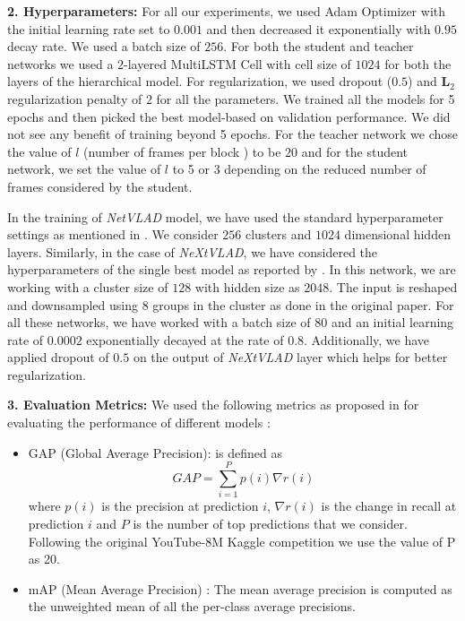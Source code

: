 \documentclass[10pt,twocolumn,letterpaper]{article}
\begin{document}
\noindent \textbf{2. Hyperparameters:}
For all our experiments, we used Adam Optimizer with the initial learning rate set to $0.001$  and then decreased it exponentially with $0.95$ decay rate. We used a batch size of $256$. For both the student and teacher networks we used a $2$-layered MultiLSTM Cell with cell size of $1024$ for both the layers of the hierarchical model. For regularization, we used dropout ($0.5$) and $\mathbf{L}_{2}$ regularization penalty of $2$ for all the parameters. We trained all the models for 5 epochs and then picked the best model-based on validation performance. We did not see any benefit of training beyond 5 epochs. For the teacher network we chose the value of $l$ (number of frames per block ) to be $20$ and for the student network, we set the value of $l$ to 5 or 3 depending on the reduced number of frames considered by the student.

In the training of \textit{NetVLAD} model, we have used the standard hyperparameter settings as mentioned in \cite{willow}. We consider $256$ clusters and $1024$ dimensional hidden layers. Similarly, in the case of \textit{NeXtVLAD}, we have considered the hyperparameters of the single best model as reported by \cite{paper3}. In this network, we are working with a cluster size of $128$ with hidden size as $2048$. The input is reshaped and downsampled using $8$ groups in the cluster as done in the original paper. For all these networks, we have worked with a batch size of $80$ and an initial learning rate of $0.0002$ exponentially decayed at the rate of $0.8$. Additionally, we have applied dropout of $0.5$ on the output of \textit{NeXtVLAD} layer which helps for better regularization. 



\noindent \textbf{3. Evaluation Metrics:} We used the following metrics as proposed in \cite{Youtube8m} for evaluating the performance of different models :
\begin{itemize}[leftmargin=*,noitemsep]
\item GAP (Global Average Precision): is defined as
\[GAP = \sum_{i=1}^{P} p(i) \nabla r(i)\]
where $p(i)$ is the precision at prediction $i$, $\nabla r(i)$ is the
change in recall at prediction $i$ and $P$ is the number of top predictions that we consider. Following the original YouTube-8M Kaggle competition we use the value of P as 20.
\item mAP (Mean Average Precision) : The mean average precision is computed
as the unweighted mean of all the per-class average precisions.
\end{itemize}
\end{document}
